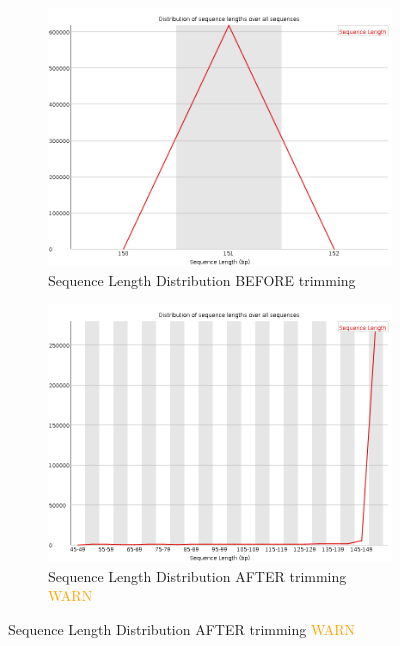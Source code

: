 \documentclass{article}
\begin{document}
\begin{figure}[htbp]
\ContinuedFloat
\centering
\begin{subfigure}{0.45\linewidth}
\includegraphics[width=\linewidth]{04-D15-22373-HT-Nextera-Myeloid-Val1-Repeat_S4_L001_R1_001_fastqc/Images/sequence_length_distribution.png}
\caption{Sequence Length Distribution BEFORE trimming}
\end{subfigure}
\begin{subfigure}{0.45\linewidth}
\includegraphics[width=\linewidth]{04-D15-22373-HT-Nextera-Myeloid-Val1-Repeat_S4_L001_R1_001.qfilter_fastqc/Images/sequence_length_distribution.png}
\caption{Sequence Length Distribution AFTER trimming \textcolor{orange}{WARN}}
\end{subfigure}

\end{figure}
\end{document}
